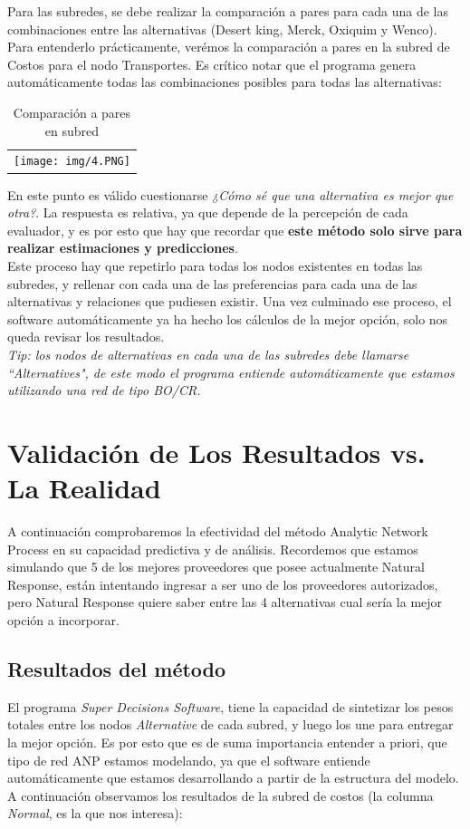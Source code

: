 \documentclass[12pt,letterpaper]{article}
\begin{document}
\newpage
Para las subredes, se debe realizar la comparación a pares para cada una de las combinaciones entre las alternativas (Desert king, Merck, Oxiquim y Wenco). Para entenderlo prácticamente, verémos la comparación a pares en la subred de Costos para el nodo Transportes. Es crítico notar que el programa genera automáticamente todas las combinaciones posibles para todas las alternativas:

\begin{table}[h]
\centering
\begin{tabular}{c}
\texttt{[image: img/4.PNG]}
\end{tabular}
\caption{Comparación a pares en subred}
\label{tab:comparacion a pares}
\end{table}

En este punto es válido cuestionarse \textit{¿Cómo sé que una alternativa es mejor que otra?}. La respuesta es relativa, ya que depende de la percepción de cada evaluador, y es por esto que hay que recordar que \textbf{este método solo sirve para realizar estimaciones y predicciones}.\\

Este proceso hay que repetirlo para todas los nodos existentes en todas las subredes, y rellenar con cada una de las preferencias para cada una de las alternativas y relaciones que pudiesen existir. Una vez culminado ese proceso, el software automáticamente ya ha hecho los cálculos de la mejor opción, solo nos queda revisar los resultados.\\

\textit{Tip: los nodos de alternativas en cada una de las subredes debe llamarse ``Alternatives", de este modo el programa entiende automáticamente que estamos utilizando una red de tipo BO/CR.}

\newpage
\section{Validación de Los Resultados vs. La Realidad}
A continuación comprobaremos la efectividad del método Analytic Network Process en su capacidad predictiva y de análisis. Recordemos que estamos simulando que 5 de los mejores proveedores que posee actualmente Natural Response, están intentando ingresar a ser uno de los proveedores autorizados, pero Natural Response quiere saber entre las 4 alternativas cual sería la mejor opción a incorporar.

\subsection{Resultados del método}
El programa \textit{Super Decisions Software}, tiene la capacidad de sintetizar los pesos totales entre los nodos \textit{Alternative} de cada subred, y luego los une para entregar la mejor opción. Es por esto que es de suma importancia entender a priori, que tipo de red ANP estamos modelando, ya que el software entiende automáticamente que estamos desarrollando a partir de la estructura del modelo.\\
A continuación observamos los resultados de la subred de costos (la columna \textit{Normal}, es la que nos interesa):
\end{document}
